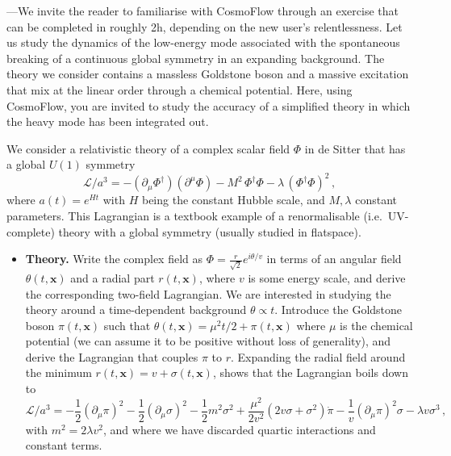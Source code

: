 \documentclass[11pt]{article}
\numberwithin{equation}{section} %
\begin{document}
\begin{framed}
{\small {}---We invite the reader to familiarise with \textsf{CosmoFlow} through an exercise that can be completed in roughly 2h, depending on the new user's relentlessness. Let us study the dynamics of the low-energy mode associated with the spontaneous breaking of a continuous global symmetry in an expanding background. The theory we consider contains a massless Goldstone boson and a massive excitation that mix at the linear order through a chemical potential. Here, using \textsf{CosmoFlow}, you are invited to study the accuracy of a simplified theory in which the heavy mode has been integrated out. 

\vskip 4pt
We consider a relativistic theory of a complex scalar field $\Phi$ in de Sitter that has a global $U(1)$ symmetry
\begin{equation}
    \mathcal{L}/a^3 = -(\partial_\mu \Phi^\dagger)(\partial^\mu \Phi) - M^2\, \Phi^\dagger\Phi - \lambda\, (\Phi^\dagger\Phi)^2\,,
\end{equation}
where $a(t) = e^{Ht}$ with $H$ being the constant Hubble scale, and $M, \lambda$ constant parameters. This Lagrangian is a textbook example of a renormalisable (i.e.~UV-complete) theory with a global symmetry (usually studied in flatspace). 

\begin{itemize}
    \item\textbf{Theory.} Write the complex field as $\Phi = \tfrac{r}{\sqrt{2}}e^{i\theta/v}$ in terms of an angular field $\theta(t, \bm{x})$ and a radial part $r(t, \bm{x})$, where $v$ is some energy scale, and derive the corresponding two-field Lagrangian. We are interested in studying the theory around a time-dependent background $\theta \propto t$. Introduce the Goldstone boson $\pi(t, \bm{x})$ such that $\theta(t, \bm{x}) = \mu^2 t/2 + \pi(t, \bm{x})$ where $\mu$ is the chemical potential (we can assume it to be positive without loss of generality), and derive the Lagrangian that couples $\pi$ to $r$. Expanding the radial field around the minimum $r(t, \bm{x}) = v + \sigma(t, \bm{x})$, shows that the Lagrangian boils down to
    \begin{equation}
    \label{eq: pi-sigma theory}
        \mathcal{L}/a^3 = -\frac{1}{2}(\partial_\mu \pi)^2 - \frac{1}{2}(\partial_\mu \sigma)^2 - \frac{1}{2}m^2\sigma^2 + \frac{\mu^2}{2v^2}\left(2v\sigma + \sigma^2\right)\dot{\pi} - \frac{1}{v}(\partial_\mu\pi)^2\sigma - \lambda v \sigma^3\,,
    \end{equation}
    with $m^2 = 2\lambda v^2$, and where we have discarded quartic interactions and constant terms.
    

\end{itemize}}
\end{framed}
\end{document}
